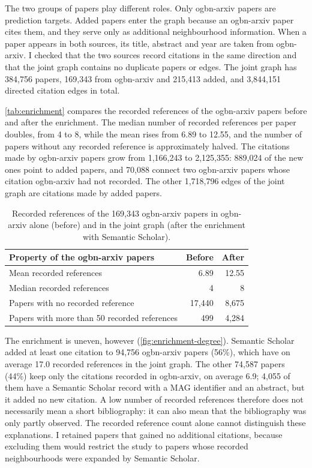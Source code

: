 The two groups of papers play different roles. Only ogbn-arxiv papers are prediction targets. Added papers enter the graph because an ogbn-arxiv paper cites them, and they serve only as additional neighbourhood information. When a paper appears in both sources, its title, abstract and year are taken from ogbn-arxiv. I checked that the two sources record citations in the same direction and that the joint graph contains no duplicate papers or edges. The joint graph has 384,756 papers, 169,343 from ogbn-arxiv and 215,413 added, and 3,844,151 directed citation edges in total.

\autoref{tab:enrichment} compares the recorded references of the ogbn-arxiv papers before and after the enrichment. The median number of recorded references per paper doubles, from 4 to 8, while the mean rises from 6.89 to 12.55, and the number of papers without any recorded reference is approximately halved. The citations made by ogbn-arxiv papers grow from 1,166,243 to 2,125,355: 889,024 of the new ones point to added papers, and 70,088 connect two ogbn-arxiv papers whose citation ogbn-arxiv had not recorded. The other 1,718,796 edges of the joint graph are citations made by added papers.

\begin{table}[!ht]
  \centering
  \begin{tabular}{lrr}
    \toprule
    Property of the ogbn-arxiv papers & Before & After \\
    \midrule
    Mean recorded references & 6.89 & 12.55 \\
    Median recorded references & 4 & 8 \\
    Papers with no recorded reference & 17,440 & 8,675 \\
    Papers with more than 50 recorded references & 499 & 4,284 \\
    \bottomrule
  \end{tabular}
  \caption{Recorded references of the 169,343 ogbn-arxiv papers in ogbn-arxiv alone (before) and in the joint graph (after the enrichment with Semantic Scholar).}
  \label{tab:enrichment}
\end{table}

The enrichment is uneven, however (\autoref{fig:enrichment-degree}). Semantic Scholar added at least one citation to 94,756 ogbn-arxiv papers (56\%), which have on average 17.0 recorded references in the joint graph. The other 74,587 papers (44\%) keep only the citations recorded in ogbn-arxiv, on average 6.9; 4,055 of them have a Semantic Scholar record with a MAG identifier and an abstract, but it added no new citation. A low number of recorded references therefore does not necessarily mean a short bibliography: it can also mean that the bibliography was only partly observed. The recorded reference count alone cannot distinguish these explanations. I retained papers that gained no additional citations, because excluding them would restrict the study to papers whose recorded neighbourhoods were expanded by Semantic Scholar.

